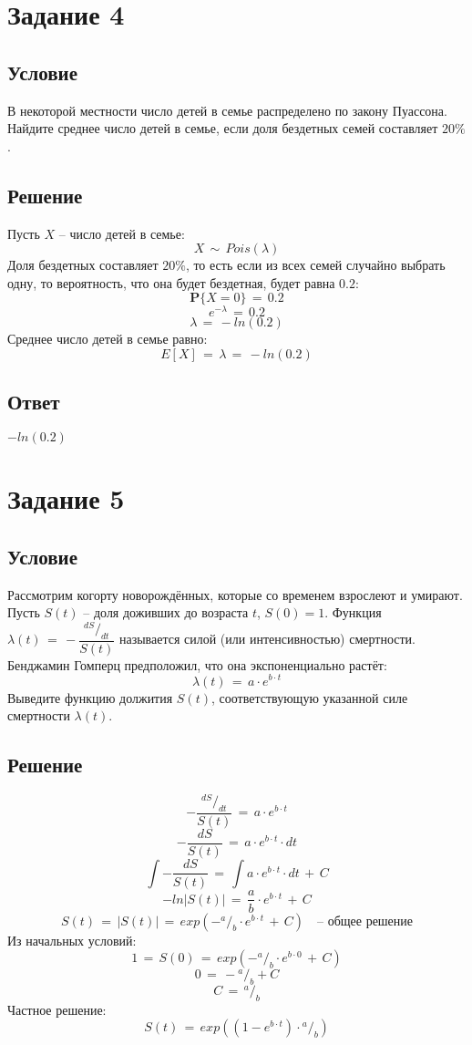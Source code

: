 \documentclass{article}
\newcommand*\rfrac[2]{{}^{#1}\!/_{#2}}
\begin{document}
\section*{Задание 4}
\subsection*{Условие}
В некоторой местности число детей в семье распределено по закону Пуассона. Найдите среднее число детей в семье, если доля бездетных семей составляет $ 20\% $.
\subsection*{Решение}
Пусть $ X $ -- число детей в семье:
\[ X \, \sim \, Pois(\lambda) \]
Доля бездетных составляет $ 20\% $, то есть если из всех семей случайно выбрать одну, то вероятность, что она будет бездетная, будет равна $ 0.2 $:
\[ \mathbf{P} \big\{ X \! = \! 0 \big\} \, = \, 0.2 \]
\[ e^{-\lambda} \, = \, 0.2 \]
\[ \lambda \, = \, -ln(0.2) \]
Среднее число детей в семье равно:
\[ E[X] \, = \, \lambda \, = \, -ln(0.2) \]
\subsection*{Ответ}
$ -ln(0.2) $
\section*{Задание 5}
\subsection*{Условие} Рассмотрим когорту новорождённых, которые со временем взрослеют и умирают. Пусть $ S(t) $ -- доля доживших до возраста $ t $, $ S(0) \! = \! 1 $. Функция $ \lambda(t) \, = \, -\dfrac{\rfrac{dS}{dt}}{S(t)} $ называется силой (или интенсивностью) смертности. Бенджамин Гомперц предположил, что она экспоненциально растёт:
\[ \lambda(t) \, = \, a \! \cdot \! e^{b \cdot t} \]
Выведите функцию должития $ S(t) $, соответствующую указанной силе смертности $ \lambda (t) $.
\subsection*{Решение}
\[ -\dfrac{\rfrac{dS}{dt}}{S(t)} \, = \, a \! \cdot \! e^{b \cdot t} \]
\[ -\dfrac{dS}{S(t)} \, = \, a \! \cdot \! e^{b \cdot t} \cdot \! dt \]
\[ \int -\dfrac{dS}{S(t)} \, = \, \int a \! \cdot \! e^{b \cdot t} \cdot \! dt \, + \, C \]
\[ -ln \left| S(t) \right| \, = \, \dfrac{a}{b} \! \cdot \! e^{b \cdot t} \, + \, C \]
\[ S(t) \, = \, \left| S(t) \right| \, = \, exp \left( -\rfrac{a}{b} \cdot \! e^{b \cdot t} \, + \, C \right) \quad \text{-- общее решение} \]
Из начальных условий:
\[ 1 \, = \, S(0) \, = \, exp \left( -\rfrac{a}{b} \cdot \! e^{b \cdot 0} \, + \, C \right) \]
\[ 0 \, = \, -\rfrac{a}{b} \! + \! C \]
\[ C \, = \, \rfrac{a}{b} \]
Частное решение:
\[ S(t) \, = \, exp \left( (1 \! - \! e^{b \cdot t}) \! \cdot \rfrac{a}{b} \right) \]
\end{document}
